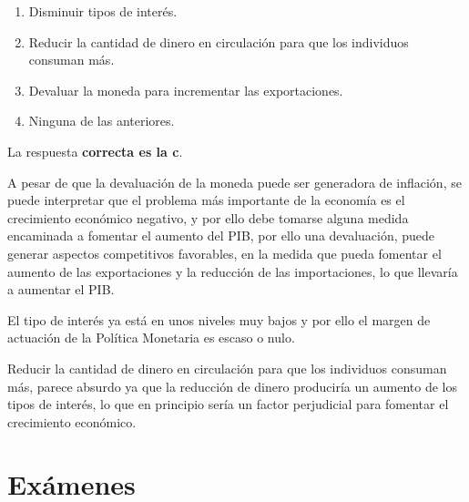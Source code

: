\documentclass[
  letterpaper,
  DIV=11,
  numbers=noendperiod]{scrreprt}
\begin{document}
\begin{enumerate}
\def\labelenumi{\alph{enumi})}
\item
  Disminuir tipos de interés.
\item
  Reducir la cantidad de dinero en circulación para que los individuos
  consuman más.
\item
  Devaluar la moneda para incrementar las exportaciones.
\item
  Ninguna de las anteriores.
\end{enumerate}

\begin{tcolorbox}[enhanced jigsaw, breakable, leftrule=.75mm, colback=white, left=2mm, colframe=quarto-callout-tip-color-frame, arc=.35mm, bottomrule=.15mm, rightrule=.15mm, toprule=.15mm, opacityback=0]
\begin{minipage}[t]{5.5mm}
\textcolor{quarto-callout-tip-color}{\faLightbulb}
\end{minipage}%
\begin{minipage}[t]{\textwidth - 5.5mm}

La respuesta \textbf{correcta es la c}.

A pesar de que la devaluación de la moneda puede ser generadora de
inflación, se puede interpretar que el problema más importante de la
economía es el crecimiento económico negativo, y por ello debe tomarse
alguna medida encaminada a fomentar el aumento del PIB, por ello una
devaluación, puede generar aspectos competitivos favorables, en la
medida que pueda fomentar el aumento de las exportaciones y la reducción
de las importaciones, lo que llevaría a aumentar el PIB.

El tipo de interés ya está en unos niveles muy bajos y por ello el
margen de actuación de la Política Monetaria es escaso o nulo.

Reducir la cantidad de dinero en circulación para que los individuos
consuman más, parece absurdo ya que la reducción de dinero produciría un
aumento de los tipos de interés, lo que en principio sería un factor
perjudicial para fomentar el crecimiento económico.

\end{minipage}%
\end{tcolorbox}


\hypertarget{exuxe1menes}{%
\chapter{Exámenes}\label{exuxe1menes}}
\end{document}
